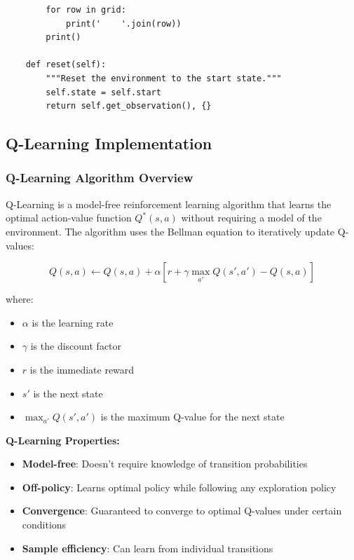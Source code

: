 \documentclass[12pt]{article}
\begin{document}
{{{\begin{verbatim}
        for row in grid:
            print('    '.join(row))
        print()

    def reset(self):
        """Reset the environment to the start state."""
        self.state = self.start
        return self.get_observation(), {}
\end{verbatim}

\subsection{Q-Learning Implementation}

\subsubsection{Q-Learning Algorithm Overview}

Q-Learning is a model-free reinforcement learning algorithm that learns the optimal action-value function $Q^*(s,a)$ without requiring a model of the environment. The algorithm uses the Bellman equation to iteratively update Q-values:

\begin{equation}
Q(s,a) \leftarrow Q(s,a) + \alpha [r + \gamma \max_{a'} Q(s',a') - Q(s,a)]
\end{equation}

where:
\begin{itemize}
    \item $\alpha$ is the learning rate
    \item $\gamma$ is the discount factor
    \item $r$ is the immediate reward
    \item $s'$ is the next state
    \item $\max_{a'} Q(s',a')$ is the maximum Q-value for the next state
\end{itemize}

\textbf{Q-Learning Properties:}
\begin{itemize}
    \item \textbf{Model-free}: Doesn't require knowledge of transition probabilities
    \item \textbf{Off-policy}: Learns optimal policy while following any exploration policy
    \item \textbf{Convergence}: Guaranteed to converge to optimal Q-values under certain conditions
    \item \textbf{Sample efficiency}: Can learn from individual transitions
\end{itemize}

}}}
\end{document}
